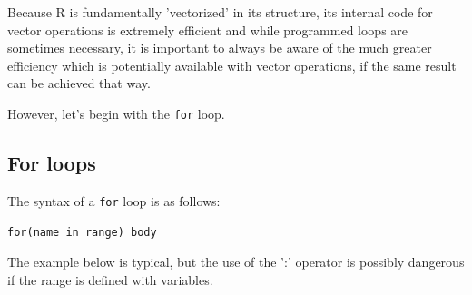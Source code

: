 \documentclass[titlepage]{book}\usepackage{knitr}
\begin{document}
Because R is fundamentally 'vectorized' in its structure, its internal code for vector operations is extremely efficient and while programmed loops are sometimes necessary, it is important to always be aware of the much greater efficiency which is potentially available with vector operations, if the same result can be achieved that way.

However, let's begin with the \texttt{for} loop.

\subsection{For loops}

The syntax of a \texttt{for} loop is as follows:

\texttt{for(name in range) body}

The example below is typical, but the use of the ':' operator is possibly dangerous if the range is defined with variables. 

\begin{knitrout}
\color{fgcolor}\begin{kframe}
\begin{alltt}
\hlcom{#------------------------------------------------------------------------------------}
 \hlkwb{<-} 
 \hlkwb{<-} \hlstd{()}
   \hlopt{:}                                                                  
   \hlkwb{<-} \hlstd{(}\hlstd{(}\hlopt{:}\hlstd{,}\hlstd{,}                                       
\hlstd{\}}
 \hlkwb{<-} \hlstd{()} \hlopt{-} 
 \hlkwb{<-} \hlstd{(} 
 \hlopt{+} \hlstd{(}\hlstd{(}   \hlstd{=} \hlstd{)}
\end{alltt}
\end{kframe}
\end{knitrout}
\end{document}
